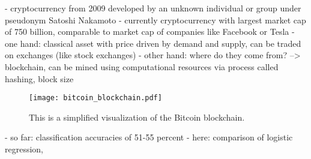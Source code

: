 - cryptocurrency from 2009 developed by an unknown individual or group under pseudonym Satoshi Nakamoto \cite{Bitcoin2009}
- currently cryptocurrency with largest market cap of 750 billion, comparable to market cap of companies like Facebook or Tesla \cite{MarketCapCompany2021} \cite{MarketCapBitcoin2021}
- one hand: classical asset with price driven by demand and supply, can be traded on exchanges (like stock exchanges)
- other hand: where do they come from? --> blockchain, can be mined using computational resources via process called hashing, block size

\begin{figure}
  \centering
  \texttt{[image: bitcoin\_blockchain.pdf]}
  \caption{This is a simplified visualization of the Bitcoin blockchain.}
\end{figure}

- so far: classification accuracies of 51-55 percent
- here: comparison of logistic regression, 